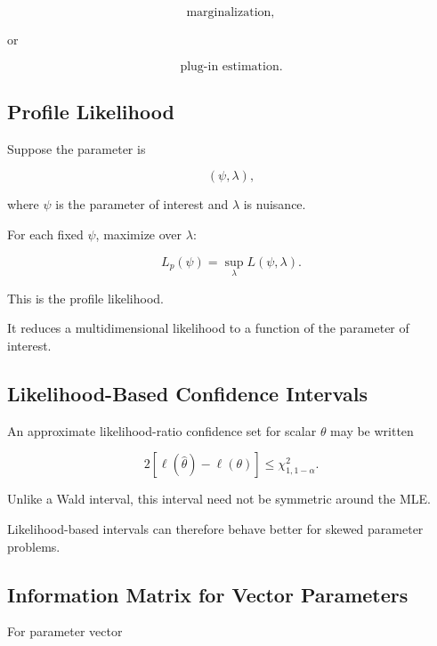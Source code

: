 \[
\boxed{
\text{marginalization},
}
\]

or

\[
\boxed{
\text{plug-in estimation}.
}
\]

\subsection{Profile Likelihood}
\label{subsec:profile-likelihood}

Suppose the parameter is

\[
(\psi,\lambda),
\]

where \(\psi\) is the parameter of interest and \(\lambda\) is nuisance.

For each fixed \(\psi\), maximize over \(\lambda\):

\[
\boxed{
L_p(\psi)
=
\sup_\lambda
L(\psi,\lambda).
}
\]

This is the profile likelihood.

It reduces a multidimensional likelihood to a function of the parameter
of interest.

\subsection{Likelihood-Based Confidence Intervals}
\label{subsec:likelihood-based-confidence-intervals}

An approximate likelihood-ratio confidence set for scalar \(\theta\) may
be written

\[
\boxed{
2
[
\ell(\widehat{\theta})
-
\ell(\theta)
]
\leq
\chi^2_{1,1-\alpha}.
}
\]

Unlike a Wald interval, this interval need not be symmetric around the
MLE.

Likelihood-based intervals can therefore behave better for skewed
parameter problems.

\subsection{Information Matrix for Vector Parameters}
\label{subsec:information-matrix}

For parameter vector

